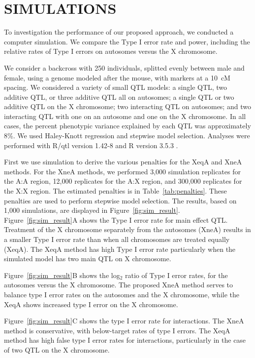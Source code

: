 \documentclass[12pt,letterpaper]{article}
\begin{document}
\clearpage
\section*{SIMULATIONS}

To investigation the performance of our proposed approach, we
conducted a computer simulation. We compare the Type I error rate and
power, including the relative rates of Type I errors on autosomes
versus the X chromosome.

We consider a backcross with 250 individuals, splitted evenly between male and female, using a genome modeled
after the mouse, with markers at a 10~cM spacing. We considered a
variety of small QTL models: a single QTL, two additive QTL, or three
additive QTL all on autosomes; a single QTL or two additive QTL on the
X chromosome; two interacting QTL on autosomes; and two interacting
QTL with one on an autosome and one on the X chromosome. In all cases,
the percent phenotypic variance explained by each QTL was
approximately 8\%. We used Haley-Knott regression \citep{Haley1992}
and stepwise model selection. Analyses were performed with R/qtl
version 1.42-8 \citep{Broman2002} and R version 3.5.3 \citep{R}.

First we use simulation to derive the various penalties for the XeqA
and XneA methods. For the XneA methods, we performed 3,000 simulation replicates for the A:A region, 12,000 replicates for the A:X region, and 300,000 replicates for the X:X region. The estimated penalties is in Table~\ref{tab:penalties}.
These penalties are used to perform stepwise model selection.
The results, based on 1,000 simulations, are displayed in
Figure~\ref{fig:sim_result}.
Figure~\ref{fig:sim_result}A shows the Type I error rate for main
effect QTL. Treatment of the X chromosome separately from the
autosomes (XneA) results in a smaller Type I error rate than when all
chromosomes are treated equally (XeqA).
The XeqA method has high Type I error rate particularly when  the
simulated model has two main QTL on X chromosome.

Figure~\ref{fig:sim_result}B shows the log$_2$ ratio of Type I error
rates, for the autosomes versus the X chromosome. The proposed XneA
method serves to balance type I error rates on the autosomes and the X
chromosome, while the XeqA shows increased type I error on the X
chromosome.

Figure~\ref{fig:sim_result}C shows the type I error rate for
interactions. The XneA method is conservative, with below-target rates of
type I errors. The XeqA method has high false type I error rates for interactions,
particularly in the case of two QTL on the X chromosome.
\end{document}
